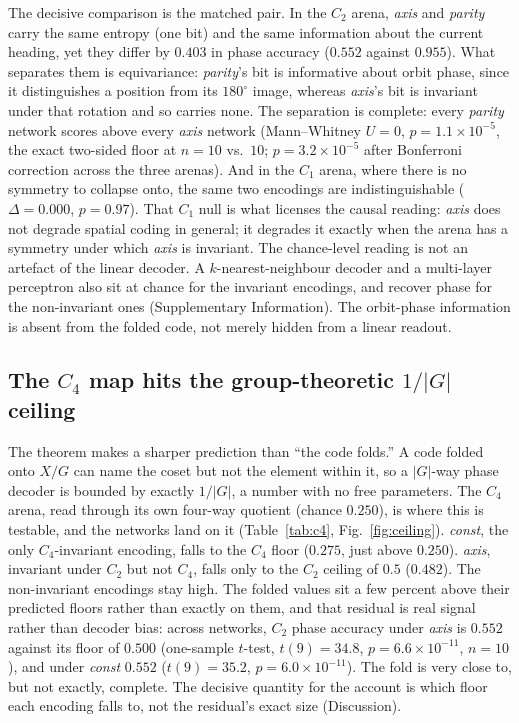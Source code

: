 \documentclass[9pt,lineno]{elife}
\begin{document}
The decisive comparison is the matched pair. In the $C_2$ arena, \textit{axis} and \textit{parity}
carry the same entropy (one bit) and the same information about the current heading, yet they differ
by $0.403$ in phase accuracy ($0.552$ against $0.955$). What separates them is equivariance:
\textit{parity}'s bit is informative about orbit phase, since it distinguishes a position from its
$180^\circ$ image, whereas \textit{axis}'s bit is invariant under that rotation and so carries none.
The separation is complete: every \textit{parity} network scores above every \textit{axis} network
(Mann--Whitney $U=0$, $p = 1.1\times10^{-5}$, the exact two-sided floor at $n=10$ vs.\ $10$;
$p = 3.2\times10^{-5}$ after Bonferroni correction across the three arenas). And in the $C_1$ arena,
where there is no symmetry to collapse onto, the same two encodings are indistinguishable
($\Delta = 0.000$, $p = 0.97$). That $C_1$ null is what licenses the causal reading: \textit{axis}
does not degrade spatial coding in general; it degrades it exactly when the arena has a symmetry under
which \textit{axis} is invariant. The chance-level reading is not an artefact of the linear decoder. A
$k$-nearest-neighbour decoder and a multi-layer perceptron also sit at chance for the invariant
encodings, and recover phase for the non-invariant ones (Supplementary Information). The orbit-phase
information is absent from the folded code, not merely hidden from a linear readout.

\subsection{The $C_4$ map hits the group-theoretic $1/|G|$ ceiling}

The theorem makes a sharper prediction than ``the code folds.'' A code folded onto $X/G$ can name the
coset but not the element within it, so a $|G|$-way phase decoder is bounded by exactly $1/|G|$, a
number with no free parameters. The $C_4$ arena, read through its own four-way quotient (chance
$0.250$), is where this is testable, and the networks land on it (Table~\ref{tab:c4},
Fig.~\ref{fig:ceiling}). \textit{const}, the only $C_4$-invariant encoding, falls to the $C_4$ floor
($0.275$, just above $0.250$). \textit{axis}, invariant under $C_2$ but not $C_4$, falls only to the
$C_2$ ceiling of $0.5$ ($0.482$). The non-invariant encodings stay high. The folded values sit a few
percent above their predicted floors rather than exactly on them, and that residual is real signal
rather than decoder bias: across networks, $C_2$ phase accuracy under \textit{axis} is $0.552$ against
its floor of $0.500$ (one-sample $t$-test, $t(9) = 34.8$, $p = 6.6\times10^{-11}$, $n = 10$), and
under \textit{const} $0.552$ ($t(9) = 35.2$, $p = 6.0\times10^{-11}$). The fold is very close to, but
not exactly, complete. The decisive quantity for the account is which floor each encoding falls to,
not the residual's exact size (Discussion).
\end{document}
